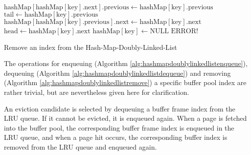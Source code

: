 \begin{@empty}
    \begin{algorithm}[h!]
        \scriptsize
        \begin{algorithmic}[1]
                        \State $\text{hashMap}\left[\text{hashMap}\left[\text{key}\right].\text{next}\right].\text{previous} \gets \text{hashMap}\left[\text{key}\right].\text{previous}$
                    \Else
                        \State $\text{tail} \gets \text{hashMap}\left[\text{key}\right].\text{previous}$
                    \EndIf
                        \State $\text{hashMap}\left[\text{hashMap}\left[\text{key}\right].\text{previous}\right].\text{next} \gets \text{hashMap}\left[\text{key}\right].\text{next}$
                    \Else
                        \State $\text{head} \gets \text{hashMap}\left[\text{key}\right].\text{next}$
                    \EndIf
                    \State $\text{hashMap}\left[\text{key}\right] \gets \text{NULL}$
                \Else
                    \State \Return $\text{ERROR!}$
                \EndIf
            \EndFunction
        \end{algorithmic}
        \vspace{1em}
        \caption[{\footnotesize \textbf{function} remove} of Hash-Map-Doubly-Linked-List]{Remove an index from the Hash-Map-Doubly-Linked-List}
        \label{alg:hashmapdoublylinkedlistremove}
    \end{algorithm}
\end{@empty}

    The operations for enqueuing (Algorithm \ref{alg:hashmapdoublylinkedlistenqueue}), dequeuing (Algorithm \ref{alg:hashmapdoublylinkedlistdequeue}) and removing (Algorithm \ref{alg:hashmapdoublylinkedlistremove}) a specific buffer pool index are rather trivial, but are nevertheless given here for clarification.

    An eviction candidate is selected by dequeuing a buffer frame index from the LRU queue. If it cannot be evicted, it is enqueued again. When a page is fetched into the buffer pool, the corresponding buffer frame index is enqueued in the LRU queue, and when a page hit occurs, the corresponding buffer index is removed from the LRU queue and enqueued again.

